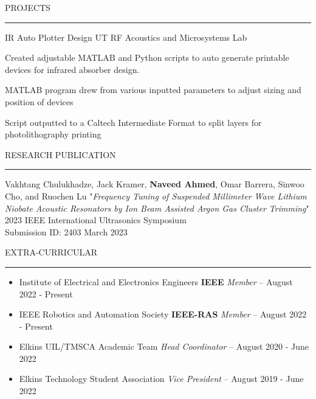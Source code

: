\documentclass{resume} %
\renewenvironment{rSection}[1]{
\sectionskip
\textcolor{BurntOrange}{\MakeUppercase{#1}}
\sectionlineskip
\hrule
\begin{list}{}{
\setlength{\leftmargin}{0em}
}
\item[]
}{
\end{list}
}
\begin{document}

\begin{rSection}{Projects}

\begin{rSubsection}{IR Auto Plotter Design \hfill UT RF Acoustics and Microsystems Lab} {}{}{}

\item Created adjustable MATLAB and Python scripts to auto generate printable devices for infrared absorber design.
\item MATLAB program drew from various inputted parameters to adjust sizing and position of devices  
\item Script outputted to a Caltech Intermediate Format to split layers for photolithography printing
 
\end{rSubsection}  



\end{rSection} 

\begin{rSection}{ Research Publication } \itemsep -3pt        

{Vakhtang Chulukhadze, Jack Kramer, \textbf{Naveed Ahmed}, Omar Barrera, Sinwoo Cho, and Ruochen Lu "\textit{Frequency Tuning of Suspended Millimeter Wave Lithium Niobate Acoustic Resonators by Ion Beam Assisted Argon Gas Cluster Trimming}" 2023 IEEE International Ultrasonics Symposium \\Submission ID: 2403} \hfill March 2023     
 
\end{rSection}




\begin{rSection}{Extra-Curricular} \itemsep -2pt   

\begin{itemize}
 
\item Institute of Electrical and Electronics Engineers \textbf{IEEE} \hfill \textit{Member} – August 2022 - Present 
\item IEEE Robotics and Automation Society \textbf{IEEE-RAS} \hfill \textit{Member} – August 2022 - Present 
\item Elkins UIL/TMSCA Academic Team \hfill \textit{Head Coordinator} – August 2020 - June 2022 
\item Elkins Technology Student Association \hfill \textit{Vice President} – August 2019 - June 2022
 
\end{itemize}  


\end{rSection} 
\end{document}
